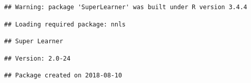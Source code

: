\documentclass[]{article}
\begin{document}
\begin{verbatim}
## Warning: package 'SuperLearner' was built under R version 3.4.4
\end{verbatim}

\begin{verbatim}
## Loading required package: nnls
\end{verbatim}

\begin{verbatim}
## Super Learner
\end{verbatim}

\begin{verbatim}
## Version: 2.0-24
\end{verbatim}

\begin{verbatim}
## Package created on 2018-08-10
\end{verbatim}
\end{document}
